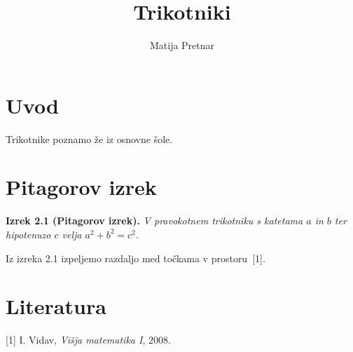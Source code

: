 \documentclass[11pt,a4paper]{article}
\title{Trikotniki}
\author{Matija Pretnar}
\date{}
\begin{document}
\maketitle

\section{Uvod}
Trikotnike poznamo že iz osnovne šole.

\section{Pitagorov izrek}
\textbf{Izrek 2.1 (Pitagorov izrek).}
\emph{V pravokotnem trikotniku s katetama \(a\) in \(b\) ter hipotenuzo \(c\) velja
\(a^2 + b^2 = c^2\).}

Iz izreka 2.1 izpeljemo razdaljo med točkama v prostoru~[1].

\section*{Literatura}
[1] I. Vidav, \emph{Višja matematika I}, 2008.
\end{document}

